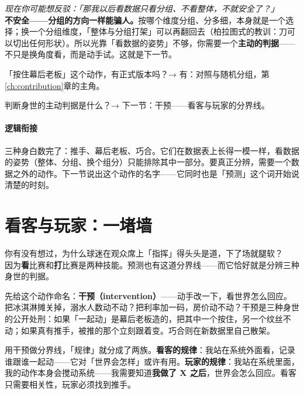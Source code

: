\documentclass[../../main2.tex]{subfiles}
\begin{document}
	\begin{questionbox}
		\textit{现在你可能想反驳：「那我以后看数据只看分组、不看整体，不就安全了？」}\\
		\textbf{不安全——分组的方向一样能骗人。}按哪个维度分组、分多细，本身就是一个选择；换一个分组维度，「整体与分组打架」可以再翻回去（柏拉图式的教训：刀可以切出任何形状）。所以光靠「看数据的姿势」不够，你需要一个\textbf{主动的判据}——不只是换角度看，而是动手试。这就是下一节。
	\end{questionbox}

	\begin{reader_anticipation}
		\item 「按住幕后老板」这个动作，有正式版本吗？→ 有：对照与随机分组，第\ref{ch:contribution}章的主角。
		\item 判断身世的主动判据是什么？→ 下一节：干预——看客与玩家的分界线。
	\end{reader_anticipation}

	\paragraph*{逻辑衔接}
	三种身白数完了：推手、幕后老板、巧合。它们在数据表上长得一模一样，看数据的姿势（整体、分组、换个组分）只能排除其中一部分。要真正分辨，需要一个数据之外的动作。下一节说出这个动作的名字——它同时也是「预测」这个词开始说清楚的时刻。

	\section{看客与玩家：一堵墙}
	\label{sec:pred-intervention}

	\begin{readingnote}
		你有没有想过，为什么球迷在观众席上「指挥」得头头是道，下了场就腿软？\\
		因为\textbf{看}比赛和\textbf{打}比赛是两种技能。预测也有这道分界线——而它恰好就是分辨三种身世的判据。
	\end{readingnote}

	先给这个动作命名：\textbf{干预（intervention）}——动手改一下，看世界怎么回应。把冰淇淋摊关掉，溺水人数动不动？把利率加一码，房价动不动？干预是三种身世的公开处刑：如果「一起动」是幕后老板造的，把其中一个按住，另一个纹丝不动；如果真有推手，被推的那个立刻跟着变。巧合则在新数据里自己散架。

	用干预做分界线，「规律」就分成了两族。\textbf{看客的规律}：我站在系统外面看，记录谁跟谁一起动——它对「世界会怎样」或许有用。\textbf{玩家的规律}：我站在系统里面，我的动作本身会搅动系统——我需要知道\textbf{我做了 X 之后}，世界会怎么回应。看客只需要相关性，玩家必须找到推手。
\end{document}
